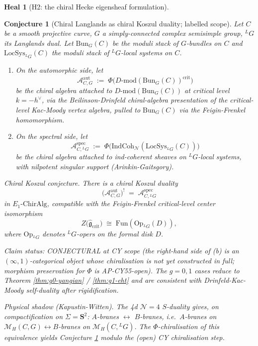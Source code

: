 \documentclass[11pt]{amsart}
\newtheorem{conjecture}[theorem]{Conjecture}
\theoremstyle{definition}
\newtheorem{heal}[attack]{Heal}
\providecommand{\DMod}{D\text{-}\mathrm{mod}}
\providecommand{\Eone}{E_1}
\providecommand{\cM}{\mathcal{M}}
\providecommand{\fg}{\mathfrak{g}}
\providecommand{\bS}{\mathbf{S}}
\providecommand{\Bun}{\mathrm{Bun}}
\providecommand{\Op}{\mathrm{Op}}
\providecommand{\LG}{{}^L G}
\begin{document}
\begin{heal}[H2: the chiral Hecke eigensheaf formulation]\leavevmode

\begin{conjecture}[Chiral Langlands as chiral Koszul duality; labelled scope]\label{conj:chiral-langlands-koszul}
Let $C$ be a smooth projective curve, $G$ a simply-connected complex
semisimple group, $\LG$ its Langlands dual. Let
$\Bun_G(C)$ be the moduli stack of $G$-bundles on $C$ and
$\mathrm{LocSys}_{\LG}(C)$ the moduli stack of $\LG$-local systems on
$C$.

\begin{enumerate}[label=(\alph*)]
\item On the automorphic side, let
\[
 \mathcal{A}^{\mathrm{aut}}_{C,G} \;:=\; \Phi\bigl(\DMod(\Bun_G(C))^{\mathrm{crit}}\bigr)
\]
be the chiral algebra attached to $\DMod(\Bun_G(C))$ at critical level
$k = -h^\vee$, via the Beilinson-Drinfeld chiral-algebra presentation
of the critical-level Kac-Moody vertex algebra, pulled to $\Bun_G(C)$
via the Feigin-Frenkel homomorphism.
\item On the spectral side, let
\[
 \mathcal{A}^{\mathrm{spec}}_{C,\LG} \;:=\; \Phi\bigl(\mathrm{IndCoh}_{\mathcal{N}}(\mathrm{LocSys}_{\LG}(C))\bigr)
\]
be the chiral algebra attached to ind-coherent sheaves on
$\LG$-local systems, with nilpotent singular support (Arinkin-Gaitsgory).
\end{enumerate}

\noindent\emph{Chiral Koszul conjecture.} There is a chiral Koszul
duality
\[
 \bigl(\mathcal{A}^{\mathrm{aut}}_{C,G}\bigr)^! \;=\; \mathcal{A}^{\mathrm{spec}}_{C,\LG}
\]
in $\Eone\text{-}\mathrm{ChirAlg}$, compatible with the Feigin-Frenkel
critical-level center isomorphism
\[
 Z\bigl(\widehat{\fg}_{\mathrm{crit}}\bigr) \;\cong\; \mathrm{Fun}(\Op_{\LG}(D)),
\]
where $\Op_{\LG}$ denotes $\LG$-opers on the formal disk $D$.

\noindent\emph{Claim status: CONJECTURAL} at CY scope (the right-hand
side of (b) is an $(\infty,1)$-categorical object whose chiralisation
is not yet constructed in full; morphism preservation for $\Phi$ is
AP-CY55-open). The $g = 0, 1$ cases reduce to Theorem \ref{thm:g0-yangian}
/ \ref{thm:g1-eht} and are consistent with Drinfeld-Kac-Moody
self-duality after rigidification.

\noindent\emph{Physical shadow (Kapustin-Witten).} The 4d $\mathcal{N}=4$
$S$-duality gives, on compactification on $\Sigma = \bS^2$:
$A$-branes $\leftrightarrow$ $B$-branes, i.e.\
$A$-branes on $\cM_H(C, G) \leftrightarrow B$-branes on
$\cM_H(C, \LG)$. The $\Phi$-chiralisation of this equivalence yields
Conjecture \ref{conj:chiral-langlands-koszul} modulo the (open) CY
chiralisation step.


\end{conjecture}
\end{heal}
\end{document}
